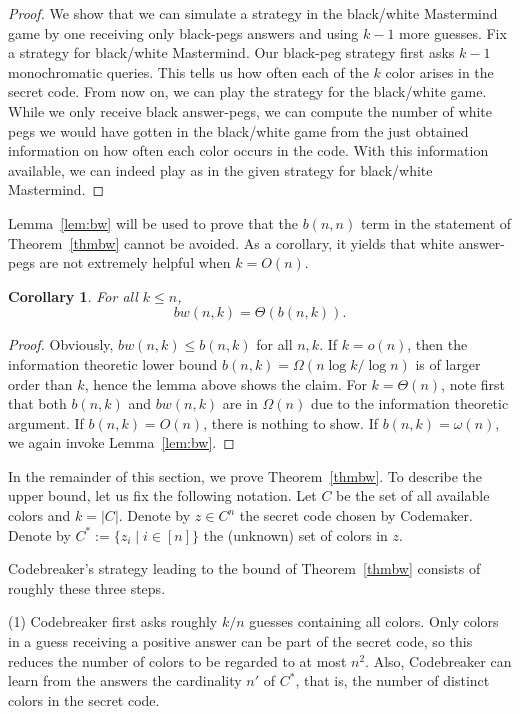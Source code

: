 \documentclass[english,a4paper,11pt]{article}
\newtheorem{corollary}[theorem]{Corollary}
\begin{document}
{\begin{proof}
We show that we can simulate a strategy in the black/white Mastermind game by one receiving only black-pegs answers and using $k-1$ more guesses. Fix a strategy for black/white Mastermind. Our black-peg strategy first asks $k-1$ monochromatic queries. This tells us how often each of the $k$ color arises in the secret code. From now on, we can play the strategy for the black/white game. While we only receive black answer-pegs, we can compute the number of white pegs we would have gotten in the black/white game from the just obtained information on how often each color occurs in the code. With this information available, we can indeed play as in the given strategy for black/white Mastermind.
\end{proof}

Lemma~\ref{lem:bw} will be used to prove that the $b(n,n)$ term in the statement of Theorem~\ref{thmbw} cannot be avoided. As a corollary, it yields that white answer-pegs are not extremely helpful when $k = O(n)$.

\begin{corollary}\label{cor:bw}
  For all $k \le n$, \[bw(n,k) = \Theta(b(n,k)).\]
\end{corollary}

\begin{proof}
  Obviously, $bw(n,k) \le b(n,k)$ for all $n,k$. If $k = o(n)$, then the information theoretic lower bound $b(n,k) = \Omega(n \log k / \log n)$ is of larger order than $k$, hence the lemma above shows the claim. For $k = \Theta(n)$, note first that both $b(n,k)$ and $bw(n,k)$ are in $\Omega(n)$ due to the information theoretic argument. If $b(n,k) = O(n)$, there is nothing to show. If $b(n,k) = \omega(n)$, we again invoke Lemma~\ref{lem:bw}.
\end{proof}

In the remainder of this section, we prove Theorem~\ref{thmbw}. 
To describe the upper bound, let us fix the following notation. Let $C$ be the set of all available colors and $k = |C|$. Denote by $z \in C^n$ the secret code chosen by Codemaker. Denote by $C^* := \{z_i \mid i \in [n]\}$ the (unknown) set of colors in $z$.

Codebreaker's strategy leading to the bound of Theorem~\ref{thmbw} consists of roughly these three steps. 

(1) Codebreaker first asks roughly $k/n$ guesses containing all colors. Only colors in a guess receiving a positive answer can be part of the secret code, so this reduces the number of colors to be regarded to at most $n^2$. Also, Codebreaker can learn from the answers the cardinality $n'$ of $C^*$, that is, the number of distinct colors in the secret code.

}
\end{document}
